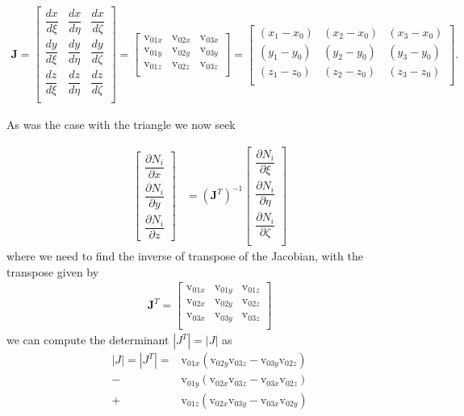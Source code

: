 \documentclass[11pt,letterpaper,titlepage]{article}
\newcommand{\beqn}{\begin{equation}
	\begin{aligned}}
\newcommand{\eeqn}{\end{aligned}
	\end{equation}}
\numberwithin{equation}{section}
\begin{document}
\begingroup
\renewcommand*{\arraystretch}{1.5}
\beqn \label{eq:jacobiantetrahedron} 
\mathbf{J }= 
\begin{bmatrix}
\dfrac{dx}{d\xi}     & \dfrac{dx}{d\eta}  &  \dfrac{dx}{d\zeta} \\
\dfrac{dy}{d\xi}     & \dfrac{dy}{d\eta}  &  \dfrac{dy}{d\zeta} \\
\dfrac{dz}{d\xi}     & \dfrac{dz}{d\eta}  &  \dfrac{dz}{d\zeta} \\
\end{bmatrix}=
\begin{bmatrix}
\text{v}_{01x}  & \text{v}_{02x} & \text{v}_{03x}  \\
\text{v}_{01y}  & \text{v}_{02y} & \text{v}_{03y}  \\
\text{v}_{01z}  & \text{v}_{02z} & \text{v}_{03z}  \\
\end{bmatrix}
=
\begin{bmatrix}
(x_1 - x_0) & (x_2 - x_0) & (x_3-x_0) \\
(y_1 - y_0)  & (y_2 - y_0) & (y_3-y_0) \\
(z_1 - z_0)  & (z_2 - z_0) & (z_3-z_0) \\
\end{bmatrix}.
\eeqn
\endgroup
\newline

As was the case with the triangle we now seek

\begingroup
\renewcommand*{\arraystretch}{1.5}
\beqn \label{eq:derivativeNtetrahedron}
\begin{bmatrix}
\dfrac{\partial N_i}{\partial x} \\
\dfrac{\partial N_i}{\partial y} \\
\dfrac{\partial N_i}{\partial z}
\end{bmatrix}
&=
(\mathbf{J}^T)^{-1}
\begin{bmatrix}
\dfrac{\partial N_i}{\partial \xi} \\
\dfrac{\partial N_i}{\partial \eta} \\
\dfrac{\partial N_i}{\partial \zeta} \\
\end{bmatrix}
\eeqn 
\endgroup
where we need to find the inverse of transpose of the Jacobian, with the transpose given by
\begingroup
\renewcommand*{\arraystretch}{1.5}
\beqn \label{eq:jacobiantransposetetrahedron} 
\mathbf{J }^T=
\begin{bmatrix}
\text{v}_{01x}  & \text{v}_{01y} & \text{v}_{01z}  \\
\text{v}_{02x}  & \text{v}_{02y} & \text{v}_{02z}  \\
\text{v}_{03x}  & \text{v}_{03y} & \text{v}_{03z}  \\
\end{bmatrix}
\eeqn
\endgroup
we can compute the determinant $|J^T|=|J|$  as
\beqn 
|J| = |J^T| =& \text{v}_{01x}       (\text{v}_{02y} \text{v}_{03z}    - \text{v}_{03y}  \text{v}_{02z} ) \\
     - &\text{v}_{01y}       (\text{v}_{02x} \text{v}_{03z}    - \text{v}_{03x}  \text{v}_{02z} ) \\
     + &\text{v}_{01z}       (\text{v}_{02x} \text{v}_{03y}    - \text{v}_{03x}  \text{v}_{02y} )
\eeqn
\end{document}
